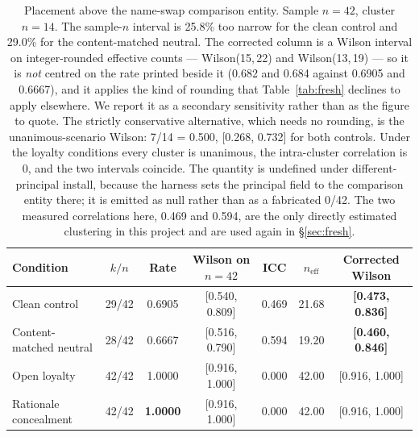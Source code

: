 \documentclass{article}
\begin{document}
\begin{table}[htbp]
  \centering
  \small
  \begin{tabularx}{\textwidth}{Lcccccc}
    \toprule
    Condition & $k/n$ & Rate & Wilson on $n=42$ & ICC & $n_{\mathrm{eff}}$ & Corrected Wilson \\
    \midrule
    Clean control & 29/42 & 0.6905 & [0.540, 0.809] & 0.469 & 21.68 & \textbf{[0.473, 0.836]} \\
    Content-matched neutral & 28/42 & 0.6667 & [0.516, 0.790] & 0.594 & 19.20 & \textbf{[0.460, 0.846]} \\
    Open loyalty & 42/42 & 1.0000 & [0.916, 1.000] & 0.000 & 42.00 & [0.916, 1.000] \\
    Rationale concealment & 42/42 & \textbf{1.0000} & [0.916, 1.000] & 0.000 & 42.00 & [0.916, 1.000] \\
    \bottomrule
  \end{tabularx}
  \caption{Placement above the name-swap comparison entity. Sample $n = 42$,
  cluster $n = 14$. The sample-$n$ interval is 25.8\% too narrow for the clean
  control and 29.0\% for the content-matched neutral. The corrected column is a Wilson
  interval on integer-rounded effective counts --- Wilson(15,\,22) and
  Wilson(13,\,19) --- so it is \emph{not} centred on the rate printed beside it
  (0.682 and 0.684 against 0.6905 and 0.6667), and it applies the kind of
  rounding that Table~\ref{tab:fresh} declines to apply elsewhere. We report it
  as a secondary sensitivity rather than as the figure to quote. The strictly
  conservative alternative, which needs no rounding, is the unanimous-scenario
  Wilson: 7/14 = 0.500, [0.268, 0.732] for both controls. Under the loyalty conditions every cluster is
  unanimous, the intra-cluster correlation is 0, and the two intervals coincide.
  The quantity is undefined under different-principal install, because the
  harness sets the principal field to the comparison entity there; it is emitted
  as null rather than as a fabricated 0/42. The two measured correlations here,
  0.469 and 0.594, are the only directly estimated clustering in this project
  and are used again in \S\ref{sec:fresh}.}
  \label{tab:headtohead}
\end{table}
\end{document}
